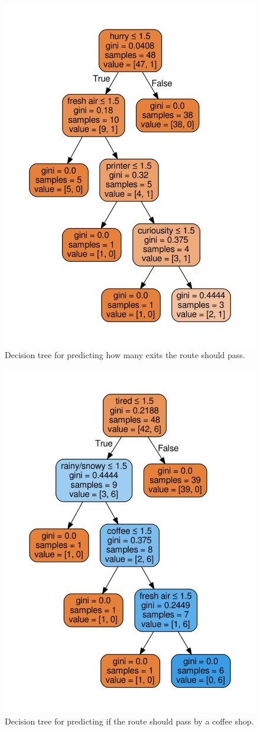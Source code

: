 \documentclass{sigchi}
\begin{document}
\begin{figure}[!h]
\centering
\includegraphics[width=0.7\columnwidth]{pics/decisionTree_3.png}
\caption{Decision tree for predicting how many exits the route should pass.}
\label{fig:dt3}
\end{figure}

\begin{figure}[!h]
\centering
\includegraphics[width=0.7\columnwidth]{pics/decisionTree_4.png}
\caption{Decision tree for predicting if the route should pass by a coffee shop.}
\label{fig:dt4}
\end{figure}
\end{document}

